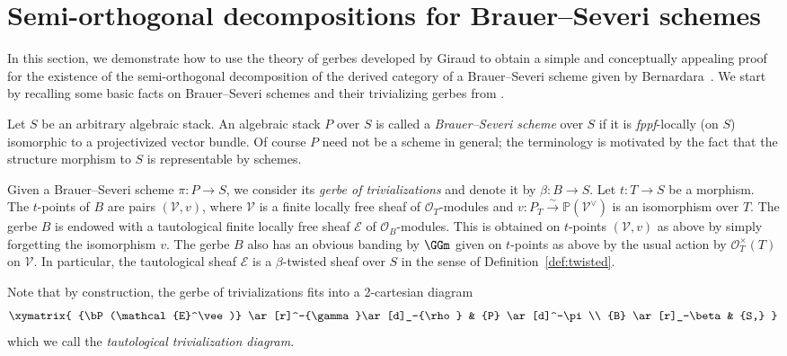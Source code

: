 \section{Semi-orthogonal decompositions for Brauer--Severi schemes}
\label{sec:brau-severi-vari}
In this section, we demonstrate how to use the theory of gerbes developed by Giraud to obtain a
simple and conceptually appealing proof for the existence of the semi-orthogonal decomposition
of the derived category of a Brauer--Severi scheme given by Bernardara~\cite[Theorem~4.1]{bernardara-BS-schemes}.
We start by recalling some basic facts on Brauer--Severi schemes and their trivializing gerbes
from \cite[Example~V.4.8]{giraud1971}.

Let $S$ be an arbitrary algebraic stack.
An algebraic stack $P$ over $S$ is called a \emph{Brauer--Severi scheme} over $S$
if it is \emph{fppf}-locally (on $S$) isomorphic to a projectivized
vector bundle.
Of course $P$ need not be a scheme in general;
the terminology is motivated by the fact that the structure
morphism to $S$ is
representable by schemes. 

Given a Brauer--Severi scheme $\pi\colon P \to S$, we consider
its \emph{gerbe of trivializations} and denote it by
$\beta\colon B \to S$.  Let $t\colon T \to S$ be a morphism.  The
$t$-points of $B$ are pairs $(\mathcal{V}, v)$, where
$\mathcal{V}$ is a finite locally free sheaf of
$\mathcal{O}_T$-modules 
and
$v\colon P_{T} \xrightarrow{\sim} \mathbb{P}(\mathcal{V}^\vee)$
is an isomorphism over $T$.
The gerbe $B$ is endowed with a tautological
finite locally free sheaf $\mathcal{E}$ of $\mathcal{O}_{B}$-modules.
This is obtained on $t$-points $(\mathcal{V}, v)$ as above by
simply forgetting the isomorphism $v$.  The gerbe $B$ also has an
obvious banding by $\GGm$ given on $t$-points as above by the
usual action by $\mathcal{O}^\times_{T}(T)$ on $\mathcal{V}$. 
In particular,
the tautological
sheaf $\mathcal{E}$ is a $\beta$-twisted sheaf over $S$ in the
sense of Definition~\ref{def:twisted}.

Note that by construction, the gerbe of trivializations fits into a 2-cartesian diagram
\begin{equation}
  \label{eq:tautological-triv}
  \xymatrix{
    {\bP(\mathcal{E}^\vee)} \ar[r]^-{\gamma}\ar[d]_-{\rho} 
    & 
    {P} \ar[d]^-\pi\\
    {B} \ar[r]_-\beta 
    & {S,}
  }
\end{equation}
which we call the \emph{tautological trivialization diagram}.

